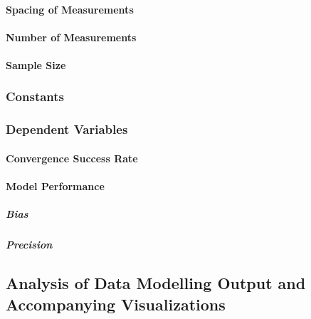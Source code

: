 \documentclass[
12pt, %
twoside,
english]{guelphthesis}
\begin{document}
\hypertarget{spacing-of-measurements-1}{%
\paragraph{Spacing of Measurements}\label{spacing-of-measurements-1}}

\hypertarget{number-of-measurements-1}{%
\paragraph{Number of Measurements}\label{number-of-measurements-1}}

\hypertarget{sample-size}{%
\paragraph{Sample Size}\label{sample-size}}

\hypertarget{constants-exp2}{%
\subsubsection{Constants}\label{constants-exp2}}

\hypertarget{dependent-variables-1}{%
\subsubsection{Dependent Variables}\label{dependent-variables-1}}

\hypertarget{convergence-success-rate}{%
\paragraph{Convergence Success Rate}\label{convergence-success-rate}}

\hypertarget{model-performance-1}{%
\paragraph{Model Performance}\label{model-performance-1}}

\hypertarget{bias}{%
\subparagraph{Bias}\label{bias}}

\hypertarget{precision}{%
\subparagraph{Precision}\label{precision}}

\hypertarget{analysis-of-data-modelling-output-and-accompanying-visualizations}{%
\subsection{Analysis of Data Modelling Output and Accompanying Visualizations}\label{analysis-of-data-modelling-output-and-accompanying-visualizations}}
\end{document}
